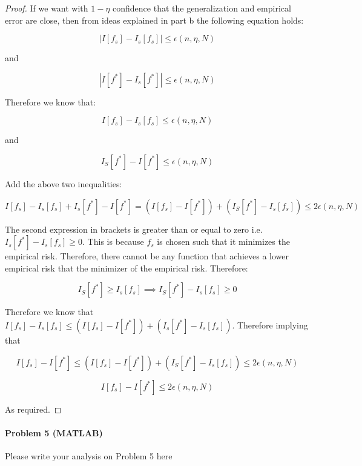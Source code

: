 \documentclass[12pt]{report}
\begin{document}
\begin{proof}

If we want with $1 - \eta$ confidence that the generalization and empirical error are close, then from ideas explained in part b the following equation holds:

$$ | I[f_s] - I_s[f_s] | \leq \epsilon(n, \eta, N)$$

and

$$ | I[f^*] - I_s[f^*] | \leq \epsilon(n, \eta, N)$$

Therefore we know that:

$$ I[f_s] - I_s[f_s] \leq \epsilon(n, \eta, N)$$

and

$$ I_S[f^*] - I[f^*] \leq \epsilon(n, \eta, N)$$

Add the above two inequalities:

$$I[f_s] - I_s[f_s] +  I_s[f^*] - I[f^*] = (I[f_s] - I[f^*]) + (I_S[f^*] - I_s[f_s])  \leq 2\epsilon(n, \eta, N)$$

The second expression in brackets is greater than or equal to zero i.e. $I_s[f^*] - I_s[f_s] \geq 0$. This is because $f_s$ is chosen such that it minimizes the empirical risk. Therefore, there cannot be any function that achieves a lower empirical risk that the minimizer of the empirical risk. Therefore:

 $$I_S[f^*] \geq I_s[f_s] \implies I_S[f^*] - I_s[f_s] \geq 0$$
 
 Therefore we know that $I[f_s] - I_s[f_s] \leq (I[f_s] - I[f^*]) + (I_s[f^*] - I_s[f_s]) $. Therefore implying that 
 
 $$I[f_s] - I[f^*] \leq (I[f_s] - I[f^*]) + (I_S[f^*] - I_s[f_s])  \leq 2\epsilon(n, \eta, N)$$
 
  $$I[f_s] - I[f^*] \leq 2\epsilon(n, \eta, N)$$
 
 As required.

\end{proof}

\paragraph{Problem 5 (MATLAB)}
Please write your analysis on Problem 5 here
\end{document}
